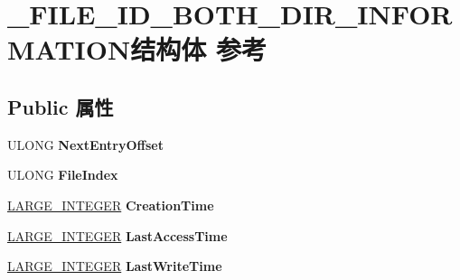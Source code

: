 \hypertarget{struct___f_i_l_e___i_d___b_o_t_h___d_i_r___i_n_f_o_r_m_a_t_i_o_n}{}\section{\+\_\+\+F\+I\+L\+E\+\_\+\+I\+D\+\_\+\+B\+O\+T\+H\+\_\+\+D\+I\+R\+\_\+\+I\+N\+F\+O\+R\+M\+A\+T\+I\+O\+N结构体 参考}
\label{struct___f_i_l_e___i_d___b_o_t_h___d_i_r___i_n_f_o_r_m_a_t_i_o_n}
\subsection*{Public 属性}
\begin{DoxyCompactItemize}
\item 
\mbox{\label{struct___f_i_l_e___i_d___b_o_t_h___d_i_r___i_n_f_o_r_m_a_t_i_o_n_ac1d6a4801c7c929f262686cda930a0bd}} 
U\+L\+O\+NG {\bfseries Next\+Entry\+Offset}
\item 
\mbox{\label{struct___f_i_l_e___i_d___b_o_t_h___d_i_r___i_n_f_o_r_m_a_t_i_o_n_a4b1f77229186017d5895e8f59c961674}} 
U\+L\+O\+NG {\bfseries File\+Index}
\item 
\mbox{\label{struct___f_i_l_e___i_d___b_o_t_h___d_i_r___i_n_f_o_r_m_a_t_i_o_n_ae0b744c3c30c3ac4983cadbe8356004f}} 
\hyperlink{union___l_a_r_g_e___i_n_t_e_g_e_r}{L\+A\+R\+G\+E\+\_\+\+I\+N\+T\+E\+G\+ER} {\bfseries Creation\+Time}
\item 
\mbox{\label{struct___f_i_l_e___i_d___b_o_t_h___d_i_r___i_n_f_o_r_m_a_t_i_o_n_a53ca7cf24b7daf7ed4a4351b1f422e82}} 
\hyperlink{union___l_a_r_g_e___i_n_t_e_g_e_r}{L\+A\+R\+G\+E\+\_\+\+I\+N\+T\+E\+G\+ER} {\bfseries Last\+Access\+Time}
\item 
\mbox{\label{struct___f_i_l_e___i_d___b_o_t_h___d_i_r___i_n_f_o_r_m_a_t_i_o_n_a2ef5b61634c514183e759dea6f63b5ad}} 
\hyperlink{union___l_a_r_g_e___i_n_t_e_g_e_r}{L\+A\+R\+G\+E\+\_\+\+I\+N\+T\+E\+G\+ER} {\bfseries Last\+Write\+Time}

\end{DoxyCompactItemize}
